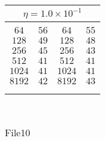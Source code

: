 \begin{center}
\begin{table}[]
\begin{center}
\begin{tabular}{@{}cc|cc@{}}
\multicolumn{4}{c}{$\eta = 1.0\times 10^{-1}$} \\[5pt]
\hline\\[-11pt]
$64$ & $56$  & $64$ & $55$ \\ [1pt]
$128$ & $49$  & $128$ & $48$ \\ [1pt]
$256$ & $45$  & $256$ & $43$ \\ [1pt]
$512$ & $41$  & $512$ & $41$ \\ [1pt]
$1024$ & $41$  & $1024$ & $41$ \\ [1pt]
$8192$ & $42$  & $8192$ & $43$ \\ [1pt]
\hline\\[-11pt]

\hline\\[-8pt]
\end{tabular}\\[5pt]
\end{center}
\normalsize
\end{table}

\begin{table}[]
  \small
  
\begin{center}
\caption{File10}\label{tab:lse3}
\begin{tabular}{@{}cc|cc@{}}


\end{tabular}
\end{center}
\end{table}
\end{center}
